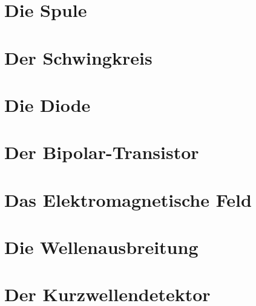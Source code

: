 \documentclass[ngerman,openany, oneside]{Script}
\begin{document}


\newpage

\chapter{Die Spule}


\chapter{Der Schwingkreis}


\chapter{Die Diode}


\chapter{Der Bipolar-Transistor}


\chapter{Das Elektromagnetische Feld}


\chapter{Die Wellenausbreitung}


\chapter{Der Kurzwellendetektor}



\end{document}
